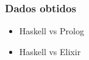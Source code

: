 \begin{frame}
    \frametitle{Dados obtidos}

    \begin{itemize}
      \item Haskell vs Prolog
      \item Haskell vs Elixir
    \end{itemize}

\end{frame}
